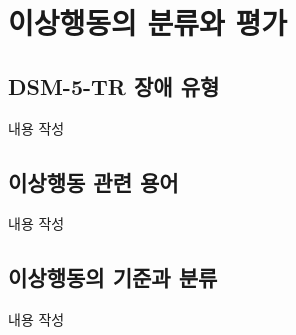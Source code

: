 \section{이상행동의 분류와 평가}

\subsection{DSM-5-TR 장애 유형}
내용 작성

\subsection{이상행동 관련 용어}
내용 작성

\subsection{이상행동의 기준과 분류}
내용 작성
